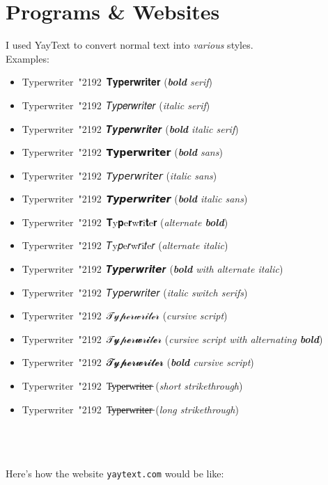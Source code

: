 \documentclass[
]{article}
\newcommand{\oneuisec}[1]{\section{\textsf{#1}}}
\begin{document}
{
\oneuisec{Programs \& Websites}
I used YayText to convert normal text into \emph{various} styles.\\
Examples:\\
\begin{itemize}\item
Typerwriter\ {\char"2192}\ {𝐓𝐲𝐩𝐞𝐫𝐰𝐫𝐢𝐭𝐞𝐫} (\textit{\textbf{bold} serif})\item
Typerwriter\ {\char"2192}\ {𝑇𝑦𝑝𝑒𝑟𝑤𝑟𝑖𝑡𝑒𝑟} (\textit{\emph{italic} serif})\item
Typerwriter\ {\char"2192}\ {𝑻𝒚𝒑𝒆𝒓𝒘𝒓𝒊𝒕𝒆𝒓} (\textit{\emph{\textbf{bold} italic} serif})\item
Typerwriter\ {\char"2192}\ {𝗧𝘆𝗽𝗲𝗿𝘄𝗿𝗶𝘁𝗲𝗿} (\textit{\textsf{\textbf{bold} sans}})\item
Typerwriter\ {\char"2192}\ {𝘛𝘺𝘱𝘦𝘳𝘸𝘳𝘪𝘵𝘦𝘳} (\textit{\textsf{\emph{italic} sans}})\item
Typerwriter\ {\char"2192}\ {𝙏𝙮𝙥𝙚𝙧𝙬𝙧𝙞𝙩𝙚𝙧} (\textit{\textsf{\emph{\textbf{bold} italic} sans}})\item
Typerwriter\ {\char"2192}\ {𝐓y𝐩e𝐫w𝐫i𝐭e𝐫} (\textit{alternate \textbf{bold}})\item
Typerwriter\ {\char"2192}\ {𝑇y𝑝e𝑟w𝑟i𝑡e𝑟} (\textit{alternate \emph{italic}})\item
Typerwriter\ {\char"2192}\ {𝑻𝙮𝒑𝙚𝒓𝙬𝒓𝙞𝒕𝙚𝒓} (\textit{\textbf{bold} with alternate \emph{italic}})\item
Typerwriter\ {\char"2192}\ {𝑇𝘺𝑝𝘦𝑟𝘸𝑟𝘪𝑡𝘦𝑟} (\textit{\emph{italic} switch \textsf{serifs}})\item
Typerwriter\ {\char"2192}\ {𝒯𝓎𝓅ℯ𝓇𝓌𝓇𝒾𝓉ℯ𝓇} (\textit{cursive script})\item
Typerwriter\ {\char"2192}\ {𝒯𝔂𝓅𝓮𝓇𝔀𝓇𝓲𝓉𝓮𝓇} (\textit{cursive script with alternating \textbf{bold}})\item
Typerwriter\ {\char"2192}\ {𝓣𝔂𝓹𝓮𝓻𝔀𝓻𝓲𝓽𝓮𝓻} (\textit{\textbf{bold} cursive script})\item
Typerwriter\ {\char"2192}\ {T̵y̵p̵e̵r̵w̵r̵i̵t̵e̵r̵} (\textit{short strikethrough})\item
Typerwriter\ {\char"2192}\ {T̶y̶p̶e̶r̶w̶r̶i̶t̶e̶r̶} (\textit{long strikethrough})
\end{itemize}}\ \\\ \\\ \\
Here's how the website \texttt{yaytext.com} would be like:\\\ \\\ \\\ \\
\end{document}
